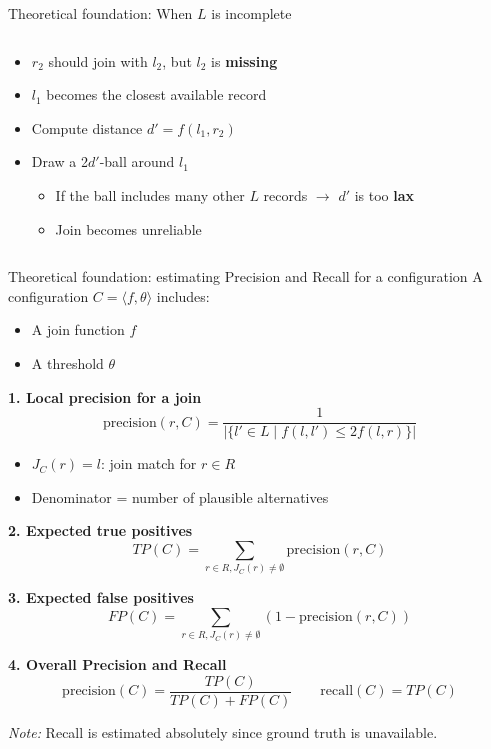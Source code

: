 \documentclass[8pt]{beamer} %
\begin{document}
\begin{frame}{Theoretical foundation: When $L$ is incomplete}
\begin{columns}
\begin{column}{0.43\textwidth}
			\begin{itemize}
				\item $r_2$ should join with $l_2$, but $l_2$ is \textbf{missing}
				\item $l_1$ becomes the closest available record
				\item Compute distance $d' = f(l_1, r_2)$
				\item Draw a 2$d'$-ball around $l_1$
				\begin{itemize}
					\item If the ball includes many other $L$ records $\rightarrow$ $d'$ is too \textbf{lax}
					\item Join becomes unreliable
				\end{itemize}
			\end{itemize}
		\end{column}
	\end{columns}
\end{frame}
	
		
\begin{frame}{Theoretical foundation: estimating Precision and Recall for a configuration}
	A configuration $C = \langle f, \theta \rangle$ includes:
	\begin{itemize}
		\item A join function $f$
		\item A threshold $\theta$
	\end{itemize}
	
	\textbf{1. Local precision for a join}
	$$
	\text{precision}(r, C) =
	\frac{1}{
		|\{ l' \in L \mid f(l, l') \leq 2f(l, r) \}|
	}
	$$
	\begin{itemize}
		\item $J_C(r) = l$: join match for $r \in R$
		\item Denominator = number of plausible alternatives
	\end{itemize}
	
	\textbf{2. Expected true positives}
	$$
	TP(C) = \sum_{r \in R, J_C(r) \neq \emptyset} \text{precision}(r, C)
	$$
	
	\textbf{3. Expected false positives}
	$$
	FP(C) = \sum_{r \in R, J_C(r) \neq \emptyset} \left(1 - \text{precision}(r, C)\right)
	$$
	
	\textbf{4. Overall Precision and Recall}
	$$
	\text{precision}(C) = \frac{TP(C)}{TP(C) + FP(C)} \quad\quad
	\text{recall}(C) = TP(C)
	$$
	
	\textit{Note:} Recall is estimated absolutely since ground truth is unavailable.
\end{frame}
\end{document}
